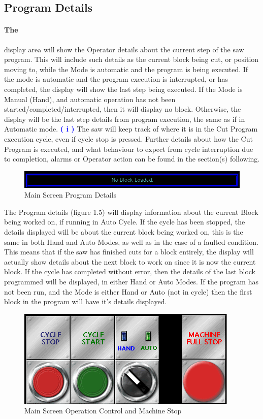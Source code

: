 \subsection{Program Details} \paragraph*{The}display area will show the Operator details about the current step of the saw program. This will include such details as the current block being cut, or position moving to, while the Mode is automatic and the program is being executed. If the mode is automatic and the program execution is interrupted, or has completed, the display will show the last step being executed. If the Mode is Manual (Hand), and automatic operation has not been started/completed/interrupted, then it will display no block. Otherwise, the display will be the last step details from program execution, the same as if in Automatic mode. 
\textbf{\LARGE \textcolor{blue}{( i )}} The saw will keep track of where it is in the Cut Program execution cycle, even if cycle stop is pressed. Further details about how the Cut Program is executed, and what behaviour to expect from cycle interruption due to completion, alarms or Operator action can be found in the section(s) following.
\begin{figure}
	\centering
	\includegraphics[width=.95\linewidth]{screen-captures/main/main-pgm-step}
	\caption{Main Screen Program Details}
	\label{fig:main-prg-det}
\end{figure}
The Program details (figure 1.5) will display information about the current Block being worked on, if running in Auto Cycle. If the cycle has been stopped, the details displayed will be about the current block being worked on, this is the same in both Hand and Auto Modes, as well as in the case of a faulted condition. This means that if the saw has finished cuts for a block entirely, the display will actually show details about the next block to work on since it is now the current block. If the cycle has completed without error, then the details of the last block programmed will be displayed, in either Hand or Auto Modes. If the program has not been run, and the Mode is either Hand or Auto (not in cycle) then the first block in the program will have it's details displayed. 
\pagebreak
\begin{figure}
	\centering
	\includegraphics[width=.95\linewidth]{screen-captures/main/main-screen-opctl}
	\caption{Main Screen Operation Control and Machine Stop}
	\label{fig:main-opctl}
\end{figure}
